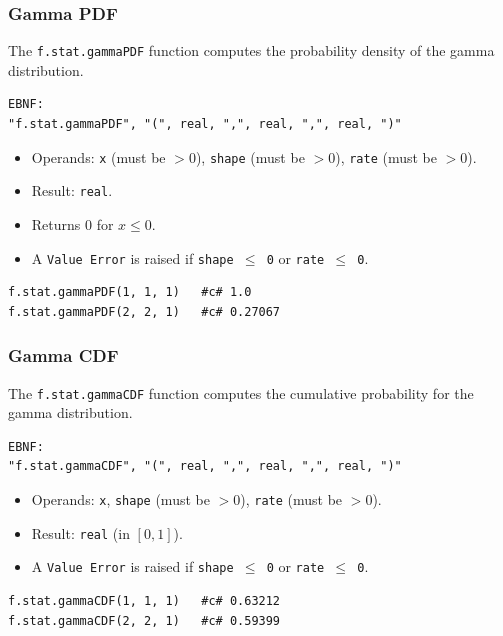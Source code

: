 \subsubsection{Gamma PDF}
The \texttt{f.stat.gammaPDF} function computes the probability density of the gamma distribution.
\begin{verbatim}
EBNF:
"f.stat.gammaPDF", "(", real, ",", real, ",", real, ")"
\end{verbatim}
\begin{itemize}
\item Operands: \texttt{x} (must be $> 0$), \texttt{shape} (must be $> 0$), \texttt{rate} (must be $> 0$).
\item Result: \texttt{real}.
\item Returns 0 for $x \leq 0$.
\item A \texttt{Value Error} is raised if \texttt{shape $\leq$ 0} or \texttt{rate $\leq$ 0}.
\end{itemize}
\begin{verbatim}
f.stat.gammaPDF(1, 1, 1)   #c# 1.0
f.stat.gammaPDF(2, 2, 1)   #c# 0.27067
\end{verbatim}

\subsubsection{Gamma CDF}
The \texttt{f.stat.gammaCDF} function computes the cumulative probability for the gamma distribution.
\begin{verbatim}
EBNF:
"f.stat.gammaCDF", "(", real, ",", real, ",", real, ")"
\end{verbatim}
\begin{itemize}
\item Operands: \texttt{x}, \texttt{shape} (must be $> 0$), \texttt{rate} (must be $> 0$).
\item Result: \texttt{real} (in $[0, 1]$).
\item A \texttt{Value Error} is raised if \texttt{shape $\leq$ 0} or \texttt{rate $\leq$ 0}.
\end{itemize}
\begin{verbatim}
f.stat.gammaCDF(1, 1, 1)   #c# 0.63212
f.stat.gammaCDF(2, 2, 1)   #c# 0.59399
\end{verbatim}


